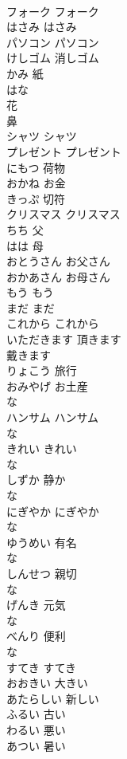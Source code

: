 \documentclass[8pt]{extreport}
\begin{document}
\begin{CJK}{UTF8}{min}
\\	フォーク	フォーク
\\	はさみ	はさみ
\\	パソコン	パソコン
\\	けしゴム	消しゴム
\\	かみ	紙
\\	はな	
\\	花 
\\	鼻
\\	シャツ	シャツ
\\	プレゼント	プレゼント
\\	にもつ	荷物
\\	おかね	お金
\\	きっぷ	切符
\\	クリスマス	クリスマス
\\	ちち	父
\\	はは	母
\\	おとうさん	お父さん
\\	おかあさん	お母さん
\\	もう	もう
\\	まだ	まだ
\\	これから	これから
\\	いただきます	頂きます 
\\	戴きます
\\	りょこう	旅行
\\	おみやげ	お土産
\\	な 
\\	ハンサム	ハンサム
\\	な 
\\	きれい	きれい
\\	な 
\\	しずか	静か
\\	な 
\\	にぎやか	にぎやか
\\	な 
\\	ゆうめい	有名
\\	な 
\\	しんせつ	親切
\\	な 
\\	げんき	元気
\\	な 
\\	べんり	便利
\\	な 
\\	すてき	すてき
\\	おおきい	大きい
\\	あたらしい	新しい
\\	ふるい	古い
\\	わるい	悪い
\\	あつい	暑い

\end{CJK}
\end{document}
